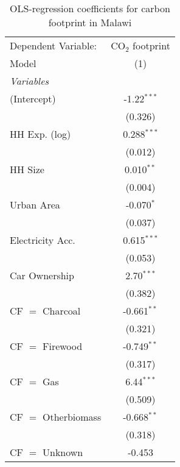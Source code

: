 
\begin{table}[htbp!]
   \centering
   \small
   \begin{adjustbox}{width = 1\textwidth, max height = 0.95\textheight, center}
      \begin{threeparttable}[b]
         \caption{\label{tab:OLS_2_MWI} OLS-regression coefficients for carbon footprint in Malawi}
         \begin{tabular}{lc}
            \tabularnewline \midrule \midrule
            Dependent Variable: & CO$_{2}$ footprint\\  
            Model               & (1)\\  
            \midrule
            \emph{Variables}\\
            (Intercept)         & -1.22$^{***}$\\   
                                & (0.326)\\   
            HH Exp. (log)       & 0.288$^{***}$\\   
                                & (0.012)\\   
            HH Size             & 0.010$^{**}$\\   
                                & (0.004)\\   
            Urban Area          & -0.070$^{*}$\\   
                                & (0.037)\\   
            Electricity Acc.    & 0.615$^{***}$\\   
                                & (0.053)\\   
            Car Ownership       & 2.70$^{***}$\\   
                                & (0.382)\\   
            CF $=$ Charcoal     & -0.661$^{**}$\\   
                                & (0.321)\\   
            CF $=$ Firewood     & -0.749$^{**}$\\   
                                & (0.317)\\   
            CF $=$ Gas          & 6.44$^{***}$\\   
                                & (0.509)\\   
            CF $=$ Otherbiomass & -0.668$^{**}$\\   
                                & (0.318)\\   
            CF $=$ Unknown      & -0.453\\   

\end{tabular}
\end{threeparttable}
\end{adjustbox}
\end{table}
